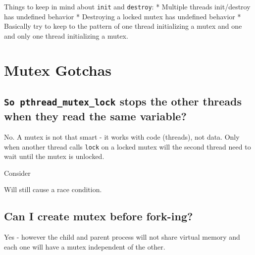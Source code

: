 Things to keep in mind about \texttt{init} and \texttt{destroy}: *
Multiple threads init/destroy has undefined behavior * Destroying a
locked mutex has undefined behavior * Basically try to keep to the
pattern of one thread initializing a mutex and one and only one thread
initializing a mutex.

\section{Mutex Gotchas}\label{mutex-gotchas}

\subsection{\texorpdfstring{\texttt{So\ pthread\_mutex\_lock} stops the
other threads when they read the same
variable?}{So pthread\_mutex\_lock stops the other threads when they read the same variable?}}\label{so-pthreadux5fmutexux5flock-stops-the-other-threads-when-they-read-the-same-variable}

No. A mutex is not that smart - it works with code (threads), not data.
Only when another thread calls \texttt{lock} on a locked mutex will the
second thread need to wait until the mutex is unlocked.

Consider

\begin{Shaded}
\begin{Highlighting}[]
 

\end{Highlighting}
\end{Shaded}

Will still cause a race condition.

\subsection{Can I create mutex before
fork-ing?}\label{can-i-create-mutex-before-fork-ing}

Yes - however the child and parent process will not share virtual memory
and each one will have a mutex independent of the other.

